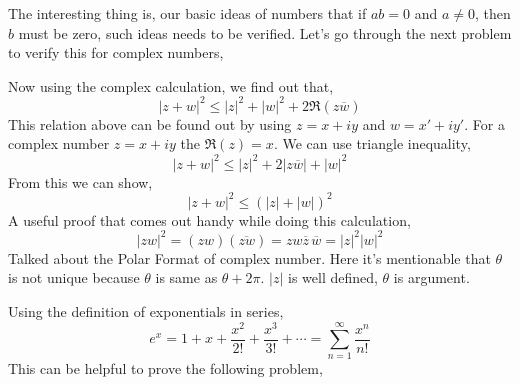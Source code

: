 \documentclass[letter]{article}
\begin{document}
The interesting thing is, our basic ideas of numbers that if $ab = 0$ and $a \neq 0$, then $b$ must be zero, such ideas needs to be verified. Let's go through the next problem to verify this for complex numbers, 


Now using the complex calculation, we find out that,
\[
|z+w|^2 \le |z|^2 + |w|^2 + 2 \Re(z \overline{w})
\]
This relation above can be found out by using $z = x + iy$ and $w = x' + i y'$. 
For a complex number $z = x + iy$ the $\Re(z) = x$. We can use triangle inequality,
\[
|z+w|^2 \le |z|^2 + 2 |z \overline{w} | + |w|^2
\] 
From this we can show, 
\[
|z+w|^2 \le (|z| + |w| )^2
\] 
A useful proof that comes out handy while doing this calculation,
\[
| z w | ^2 = (zw) ( \overline{zw}) = zw \overline{z} \, \overline{w} = |z|^2 |w|^2
\] 
Talked about the Polar Format of complex number. Here it's mentionable that $\theta$ is not unique because $\theta$ is same as $\theta + 2\pi $. $|z|$ is well defined, $\theta$ is argument.

Using the definition of exponentials in series, \[
	e^{x} = 1 + x + \frac{x^2}{2!} + \frac{x^3}{3!} + \cdots = \sum_{n=1}^{\infty} \frac{x^{n}}{n!}
\] 
This can be helpful to prove the following problem,
\end{document}
